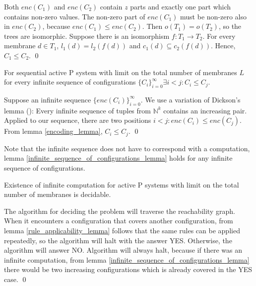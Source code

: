 \begin{dokaz}
  Both $enc(C_1)$ and $enc(C_2)$ contain $z$ parts and exactly one part which contains non-zero values. The non-zero part of $enc(C_1)$ must be non-zero also in $enc(C_2)$, because $enc(C_1)\leq enc(C_2)$. Then $o(T_1)=o(T_2)$, so the trees are isomorphic. Suppose there is an isomorphism $f:T_1\rightarrow T_2$. For every membrane $d\in T_1$, $l_1(d)=l_2(f(d))$ and $c_1(d)\subseteq c_2(f(d))$. Hence, $C_1\leq C_2$.
  \qed
\end{dokaz}

\begin{lemma}
\label{infinite_sequence_of_configurations_lemma}
  For sequential active P system with limit on the total number of membranes $L$ for every infinite sequence of configurations $\{C_i\}_{i=0}^\infty\exists i<j: C_i\leq C_j$.
\end{lemma}

\begin{dokaz}
  Suppose an infinite sequence $\{enc(C_i)\}_{i=0}^\infty$. We use a variation of Dickson's lemma (\cite{Figueira11Dickson}): Every infinite sequence of tuples from $\mathbb N^k$ contains an increasing pair. Applied to our sequence, there are two positions $i<j: enc(C_i)\leq enc(C_j)$. From lemma \ref{encoding_lemma}, $C_i\leq C_j$.
  \qed
\end{dokaz}

Note that the infinite sequence does not have to correspond with a computation, lemma \ref{infinite_sequence_of_configurations_lemma} holds for any infinite sequence of configurations.

\begin{veta}
  Existence of infinite computation for active P systems with limit on the total number of membranes is decidable.
\end{veta}

\begin{dokaz}
  The algorithm for deciding the problem will traverse the  reachability graph. When it encounters a configuration that covers another configuration, from lemma \ref{rule_applicability_lemma} follows that the same rules can be applied repeatedly, so the algorithm will halt with the answer YES.
  Otherwise, the algorithm will answer NO.
  Algorithm will always halt, because if there was an infinite computation, from lemma \ref{infinite_sequence_of_configurations_lemma} there would be two increasing configurations which is already covered in the YES case.
  \qed
\end{dokaz}

